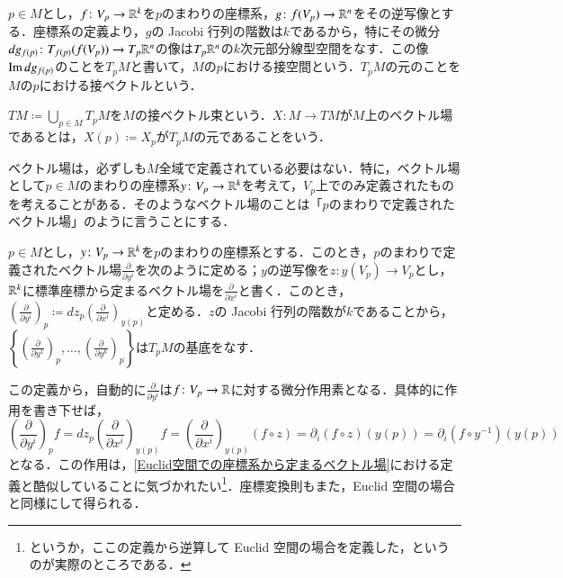 \begin{defi}
$p \in M$とし，$f \colon V_p \to \mathbb{R}^k$を$p$のまわりの座標系，$g \colon f(V_p) \to \mathbb{R}^n$をその逆写像とする．座標系の定義より，$g$の Jacobi 行列の階数は$k$であるから，特にその微分$dg_{f(p)} \colon T_{f(p)}(f(V_p)) \to T_p \mathbb{R}^n$の像は$T_p \mathbb{R}^n$の$k$次元部分線型空間をなす．この像$\operatorname{Im} dg_{f(p)}$のことを$T_pM$と書いて，$M$の$p$における接空間という．$T_pM$の元のことを$M$の$p$における接ベクトルという．

$TM \coloneqq \bigcup_{p \in M} T_pM$を$M$の接ベクトル束という．$X \colon M \to TM$が$M$上のベクトル場であるとは，$X(p) \coloneqq X_p$が$T_pM$の元であることをいう．
\end{defi}

ベクトル場は，必ずしも$M$全域で定義されている必要はない．特に，ベクトル場として$p \in M$のまわりの座標系$y \colon V_p \to \mathbb{R}^k$を考えて，$V_p$上でのみ定義されたものを考えることがある．そのようなベクトル場のことは「$p$のまわりで定義されたベクトル場」のように言うことにする．

\begin{defi}
$p \in M$とし，$y \colon V_p \to \mathbb{R}^k$を$p$のまわりの座標系とする．このとき，$p$のまわりで定義されたベクトル場$\frac{\partial}{\partial y^i}$を次のように定める；$y$の逆写像を$z \colon y(V_p) \to V_p$とし，$\mathbb{R}^k$に標準座標から定まるベクトル場を$\frac{\partial}{\partial x^i}$と書く．このとき，$\left( \frac{\partial}{\partial y^i} \right)_p \coloneqq dz_p \left(\frac{\partial}{\partial x^i} \right)_{y(p)}$と定める．$z$の Jacobi 行列の階数が$k$であることから，$\left\{\left(\frac{\partial}{\partial y^1}\right)_p, \dots, \left(\frac{\partial}{\partial y^k}\right)_p\right\}$は$T_pM$の基底をなす．
\end{defi}

この定義から，自動的に$\frac{\partial}{\partial y^i}$は$f \colon V_p \to \mathbb{R}$に対する微分作用素となる．具体的に作用を書き下せば，
\begin{equation}
\left( \frac{\partial}{\partial y^i} \right)_p f = dz_p \left(\frac{\partial}{\partial x^i} \right)_{y(p)} f = \left(\frac{\partial}{\partial x^i} \right)_{y(p)} (f \circ z) = \partial_i  (f \circ z) (y(p)) = \partial_i  (f \circ y^{-1}) (y(p))
\end{equation}となる．この作用は，\cref{Euclid空間での座標系から定まるベクトル場}における定義と酷似していることに気づかれたい\footnote{というか，ここの定義から逆算して Euclid 空間の場合を定義した，というのが実際のところである．}．座標変換則もまた，Euclid 空間の場合と同様にして得られる．

